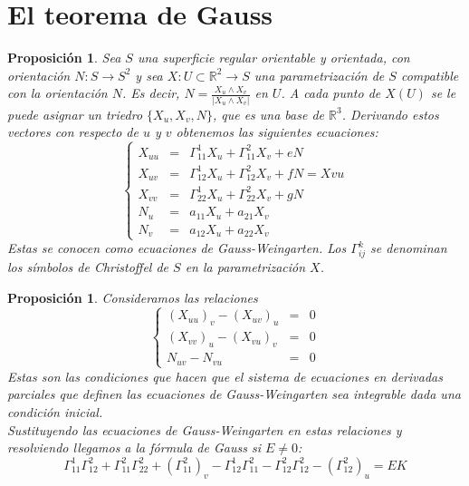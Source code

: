 \documentclass{report}
\newtheorem{proposition}[theorem]{Proposición}
\theoremstyle{remark}
\theoremstyle{remark}
\theoremstyle{definition}
\theoremstyle{definition}
\theoremstyle{definition}
\begin{document}
\section{El teorema de Gauss}

\begin{proposition}
    Sea $S$ una superficie regular orientable y orientada, con orientación $N: S \to S^2$ y sea $X: U \subset \mathbb{R}^2 \to S$ una parametrización de $S$ compatible con la orientación $N$.
    Es decir, $N = \frac{X_u \land X_v}{|X_u \land X_v|}$ en $U$.
    A cada punto de $X(U)$ se le puede asignar un triedro $\{X_u, X_v, N\}$, que es una base de $\mathbb{R}^3$.
    Derivando estos vectores con respecto de $u$ y $v$ obtenemos las siguientes ecuaciones:
    $$\left\{
        \begin{array}{lcl}
            X_{uu} & = & \Gamma^1_{11}X_u + \Gamma^2_{11}X_v + eN         \\
            X_{uv} & = & \Gamma^1_{12}X_u + \Gamma^2_{12}X_v + fN = X{vu} \\
            X_{vv} & = & \Gamma^1_{22}X_u + \Gamma^2_{22}X_v + gN         \\
            N_u    & = & a_{11}X_u + a_{21}X_v                            \\
            N_v    & = & a_{12}X_u + a_{22}X_v
        \end{array}
        \right.$$
    Estas se conocen como ecuaciones de Gauss-Weingarten.
    Los $\Gamma^k_{ij}$ se denominan los símbolos de Christoffel de $S$ en la parametrización $X$.
\end{proposition}

\begin{proposition}
    Consideramos las relaciones
    $$\left\{
        \begin{array}{lcl}
            (X_{uu})_v - (X_{uv})_u & = & 0 \\
            (X_{vv})_u - (X_{vu})_v & = & 0 \\
            N_{uv} - N_{vu}         & = & 0
        \end{array}
        \right.$$
    Estas son las condiciones que hacen que el sistema de ecuaciones en derivadas parciales que definen las ecuaciones de Gauss-Weingarten sea integrable dada una condición inicial.\\
    Sustituyendo las ecuaciones de Gauss-Weingarten en estas relaciones y resolviendo llegamos a la fórmula de Gauss si $E \neq 0$:
    $$\Gamma^1_{11} \Gamma^2_{12} + \Gamma^2_{11} \Gamma^2_{22} + (\Gamma^2_{11})_v - \Gamma^1_{12} \Gamma^2_{11} - \Gamma^2_{12} \Gamma^2_{12} - (\Gamma^2_{12})_u = EK$$
\end{proposition}
\end{document}
